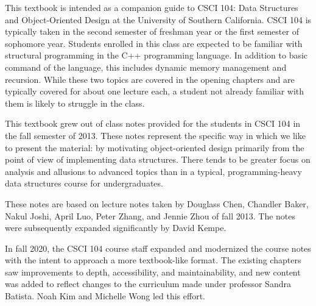 This textbook is intended as a companion guide to CSCI 104: Data Structures and Object-Oriented Design at the University of Southern California.
CSCI 104 is typically taken in the second semester of freshman year or the first semester of sophomore year.
Students enrolled in this class are expected to be familiar with structural programming in the C++ programming language.
In addition to basic command of the language, this includes dynamic memory management and recursion.
While these two topics are covered in the opening chapters and are typically covered for about one lecture each, a student not already familiar with them is likely to struggle in the class.

This textbook grew out of class notes provided for the students in CSCI 104 in the fall semester of 2013.
These notes represent the specific way in which we like to present the material: by motivating object-oriented design primarily from the point of view of implementing data structures.
There tends to be greater focus on analysis and allusions to advanced topics than in a typical, programming-heavy data structures course for undergraduates.

These notes are based on lecture notes taken by Douglass Chen, Chandler Baker, Nakul Joshi, April Luo, Peter Zhang, and Jennie Zhou of fall 2013.
The notes were subsequently expanded significantly by David Kempe.

In fall 2020, the CSCI 104 course staff expanded and modernized the course notes with the intent to approach a more textbook-like format.
The existing chapters saw improvements to depth, accessibility, and maintainability, and new content was added to reflect changes to the curriculum made under professor Sandra Batista.
Noah Kim and Michelle Wong led this effort.
